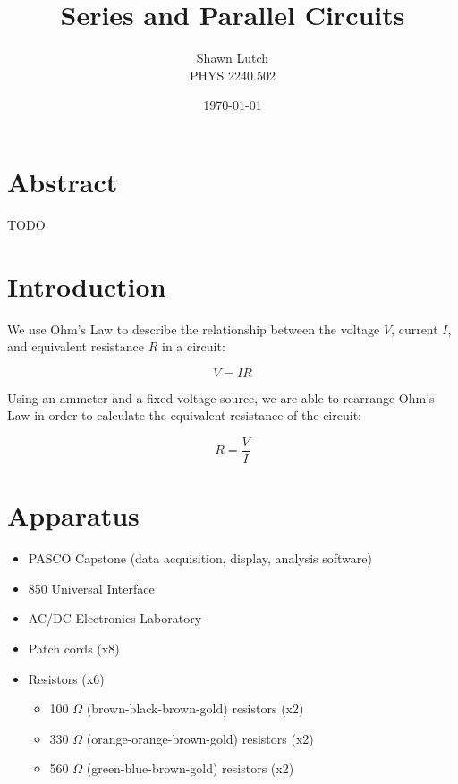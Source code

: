 \documentclass[12pt,letterpaper,titlepage]{report}
\newcommand{\myTitle}{Series and Parallel Circuits}
\newcommand{\myName}{Shawn Lutch}
\newcommand{\myPeriod}{PHYS 2240.502}
\begin{document}


\title{\myTitle{}}
\author{\myName{}\\ \myPeriod{}}
\date{\today}
\maketitle




\section*{Abstract}

TODO



\bigskip
\section*{Introduction}

We use Ohm's Law to describe the relationship between the voltage $V$, current $I$, and equivalent resistance $R$ in a circuit:

$$V = IR$$

Using an ammeter and a fixed voltage source, we are able to rearrange Ohm's Law in order to calculate the equivalent resistance of the circuit:

$$R = \frac{V}{I}$$





\bigskip
\section*{Apparatus}

\begin{itemize}
	\item PASCO Capstone (data acquisition, display, analysis software)
	\item 850 Universal Interface
	\item AC/DC Electronics Laboratory
	\item Patch cords (x8)
	\item Resistors (x6)
		\begin{itemize}
			\item 100 $\Omega$ (brown-black-brown-gold) resistors (x2)
			\item 330 $\Omega$ (orange-orange-brown-gold) resistors (x2)
			\item 560 $\Omega$ (green-blue-brown-gold) resistors (x2)
		\end{itemize}
\end{itemize}
\end{document}
